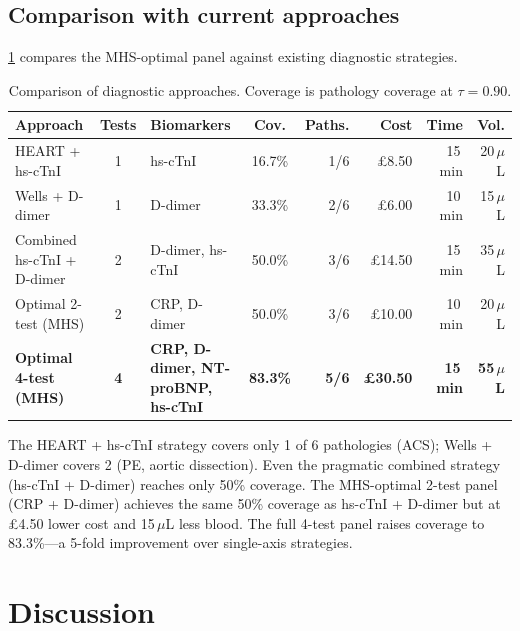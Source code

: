 \documentclass[times, twoside, watermark]{zHenriquesLab-StyleBioRxiv}
\begin{document}
\subsection*{Comparison with current approaches}

\cref{tab:comparison} compares the MHS-optimal panel against existing diagnostic strategies.

\begin{table}[!htb]
\centering
\caption{Comparison of diagnostic approaches. Coverage is pathology coverage at $\tau = 0.90$.}
\label{tab:comparison}
\small
\begin{tabular}{@{}lclcrrrr@{}}
\toprule
\textbf{Approach} & \textbf{Tests} & \textbf{Biomarkers} & \textbf{Cov.} & \textbf{Paths.} & \textbf{Cost} & \textbf{Time} & \textbf{Vol.} \\
\midrule
HEART + hs-cTnI & 1 & hs-cTnI & 16.7\% & 1/6 & \pounds8.50 & 15\,min & 20\,$\mu$L \\
Wells + D-dimer & 1 & D-dimer & 33.3\% & 2/6 & \pounds6.00 & 10\,min & 15\,$\mu$L \\
Combined hs-cTnI + D-dimer & 2 & D-dimer, hs-cTnI & 50.0\% & 3/6 & \pounds14.50 & 15\,min & 35\,$\mu$L \\
Optimal 2-test (MHS) & 2 & CRP, D-dimer & 50.0\% & 3/6 & \pounds10.00 & 10\,min & 20\,$\mu$L \\
\textbf{Optimal 4-test (MHS)} & \textbf{4} & \textbf{CRP, D-dimer, NT-proBNP, hs-cTnI} & \textbf{83.3\%} & \textbf{5/6} & \textbf{\pounds30.50} & \textbf{15\,min} & \textbf{55\,$\mu$L} \\
\bottomrule
\end{tabular}
\end{table}

\noindent The HEART + hs-cTnI strategy covers only 1 of 6 pathologies (ACS); Wells + D-dimer covers 2 (PE, aortic dissection). Even the pragmatic combined strategy (hs-cTnI + D-dimer) reaches only 50\% coverage. The MHS-optimal 2-test panel (CRP + D-dimer) achieves the same 50\% coverage as hs-cTnI + D-dimer but at \pounds4.50 lower cost and 15\,$\mu$L less blood. The full 4-test panel raises coverage to 83.3\%---a 5-fold improvement over single-axis strategies.


\section*{Discussion}
\end{document}
